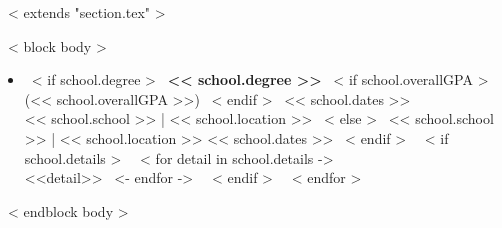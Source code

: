~< extends "section.tex" >~

~< block body >~
\vspace{-2mm}
\begin{itemize}
~< for school in items >~
\item
  ~< if school.degree >~
    \textbf{<< school.degree >>}
    ~< if school.overallGPA >~
        (<< school.overallGPA >>)
    ~< endif >~
    \hfill << school.dates >> \\
    << school.school >> | << school.location >>
  ~< else >~
    << school.school >> | << school.location >> \hfill << school.dates >>
  ~< endif >~
  ~< if school.details >~
    ~< for detail in school.details ->~
        ~\\ <<detail>>
    ~<- endfor ->~
  ~< endif >~
  \vspace{3mm}
~< endfor >~
\end{itemize}
\vspace{-3mm}
~< endblock body >~
